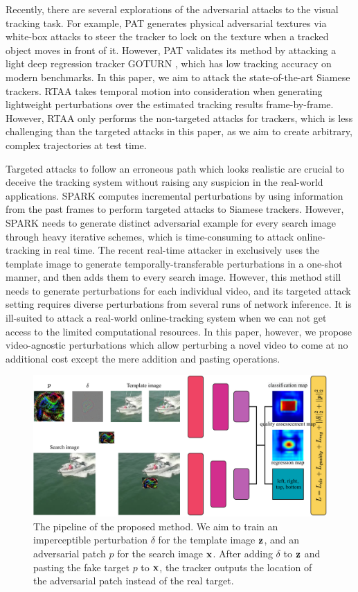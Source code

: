 \documentclass{article}
\begin{document}
Recently, there are several explorations of the adversarial attacks to the visual tracking task. For example, PAT \cite{PAT} generates physical adversarial textures via white-box attacks to steer the tracker to lock on the texture when a tracked object moves in front of it. However, PAT validates its method by attacking a light deep regression tracker GOTURN \cite{GOTURN}, which has low tracking accuracy on modern benchmarks. In this paper, we aim to attack the state-of-the-art Siamese trackers.
RTAA \cite{RTAA} takes temporal motion into consideration when generating lightweight perturbations over the estimated tracking results frame-by-frame. However, RTAA only performs the non-targeted attacks for trackers, which is less challenging than the targeted attacks in this paper, as we aim to create arbitrary, complex trajectories at test time. 

Targeted attacks to follow an erroneous path which looks realistic are crucial to deceive the tracking system without raising any suspicion in the real-world applications.
SPARK \cite{SPARK} computes incremental perturbations by using information from the past frames to perform targeted attacks to Siamese trackers. However, SPARK needs to generate distinct adversarial example for every search image through heavy iterative schemes, which is time-consuming to attack online-tracking in real time. The recent real-time attacker in \cite{TemporallyTransferablePerturbations} exclusively uses the template image to generate temporally-transferable perturbations in a one-shot manner, and then adds them to every search image. However, this method still needs to generate perturbations for each individual video, and its targeted attack setting requires diverse perturbations from several runs of network inference. It is ill-suited to attack a real-world online-tracking system when we can not get access to the limited computational resources. In this paper, however, we propose video-agnostic perturbations which allow perturbing a novel video to come at no additional cost except the mere addition and pasting operations.

\begin{figure}[t]
\centering
\includegraphics[width=1.0\textwidth]{images/network_v3.pdf}
\caption{The pipeline of the proposed method. We aim to train an imperceptible perturbation $\delta$ for the template image $\textbf z$, and an adversarial patch $p$ for the search image $\textbf x$. After adding $\delta$ to $\textbf z$ and pasting the fake target $p$ to $\textbf x$, the tracker outputs the location of the adversarial patch instead of the real target.}
\end{figure}
\end{document}

